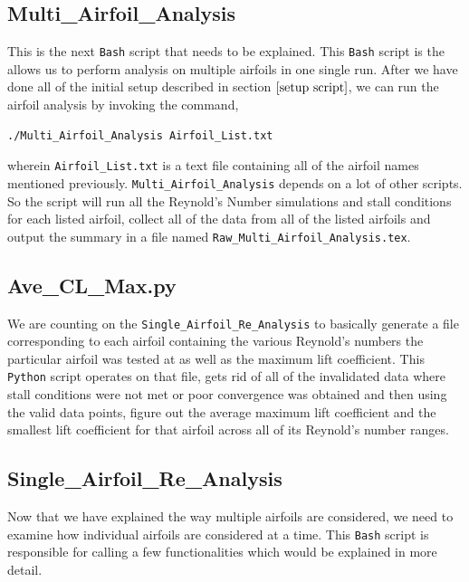 \subsection{Multi\_Airfoil\_Analysis}

This is the next \texttt{Bash} script that needs to be explained. This \texttt{Bash} script is the allows us to perform analysis on multiple airfoils in one single run. After we have done all of the initial setup described in section $\ref{setup script}$, we can run the airfoil analysis by invoking the command,
\begin{lstlisting}
./Multi_Airfoil_Analysis Airfoil_List.txt
\end{lstlisting}
wherein \texttt{Airfoil\_List.txt} is a text file containing all of the airfoil names mentioned previously. \texttt{Multi\_Airfoil\_Analysis}  depends on a lot of other scripts. So the script will run all the Reynold's Number simulations and stall conditions for each listed airfoil, collect all of the data from all of the listed airfoils and output the summary in a file named \texttt{Raw\_Multi\_Airfoil\_Analysis.tex}. 


\subsection{Ave\_CL\_Max.py}

We are counting on the \texttt{Single\_Airfoil\_Re\_Analysis} to basically generate a file corresponding to each airfoil containing the various Reynold's numbers the particular airfoil was tested at as well as the maximum lift coefficient. This \texttt{Python} script operates on that file, gets rid of all of the invalidated data where stall conditions were not met or poor convergence was obtained and then using the valid data points, figure out the average maximum lift coefficient and the smallest lift coefficient for that airfoil across all of its Reynold's number ranges. 


\subsection{Single\_Airfoil\_Re\_Analysis}

Now that we have explained the way multiple airfoils are considered, we need to examine how individual airfoils are considered at a time. This \texttt{Bash} script is responsible for calling a few functionalities which would be explained in more detail.



